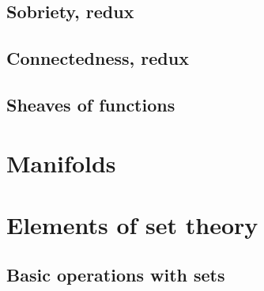\documentclass[a4paper,nobib,nols]{tufte-book}
\begin{document}
\section{Sobriety, redux}%
\label{sec:sobriety_redux}

\section{Connectedness, redux}%
\label{sec:connectedness_redux}

\section{Sheaves of functions}%
\label{sec:sheaves_of_functions}

\chapter{Manifolds}%
\label{cha:manifolds}

\appendix

\chapter{Elements of set theory}%
\label{cha:elements_of_set_theory}

\section{Basic operations with sets}%
\label{sec:basic_operations_with_sets}
\end{document}
